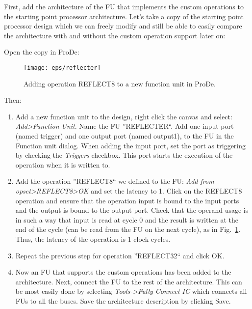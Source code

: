 \documentclass[twoside]{tceusermanual}
\begin{document}
First, add the architecture of the FU that implements the custom operations
to the starting point processor architecture. Let's take a copy of the starting
point processor design which we can freely modify and still be able to easily
compare the architecture with and without the custom operation support later on:


Open the copy in ProDe:


\begin{figure}
  \begin{center} \texttt{[image: eps/reflecter]}
  \caption{Adding operation REFLECT8 to a new function unit in ProDe.} 
  \label{fig:reflecter} \end{center}
\end{figure}

Then:
\begin{enumerate}
\item%
  Add a new function unit to the design, right click the canvas and
  select: \textit{Add>Function Unit}.  Name the FU ''REFLECTER``. Add
  one input port (named trigger) and one output port (named output1), to
  the FU in the Function unit dialog. When adding the input port, set
  the port as triggering by checking the \textit{Triggers} checkbox. This port
  starts the execution of the operation when it is written to.
\item%
  Add the operation ''REFLECT8`` we defined to the FU: \textit{Add
  from opset>REFLECT8>OK} and set the latency to 1. Click on the
  REFLECT8 operation and ensure that the operation input is bound to
  the input ports and the output is bound to the output port. Check
  that the operand usage is in such a way that input is read at cycle
  0 and the result is written at the end of the cycle (can be read
  from the FU on the next cycle), as in
  Fig.~\ref{fig:reflecter}. Thus, the latency of the operation is 1
  clock cycles.
\item%
  Repeat the previous step for operation ''REFLECT32`` and click OK.
\item%
  Now an FU that supports the custom operations has been added to the
  architecture. Next, connect the FU to the rest of the
  architecture. This can be most easily done by selecting
  \textit{Tools->Fully Connect IC} which connects all FUs to all the
  buses. Save the architecture description by clicking Save.
\end{enumerate}
\end{document}
